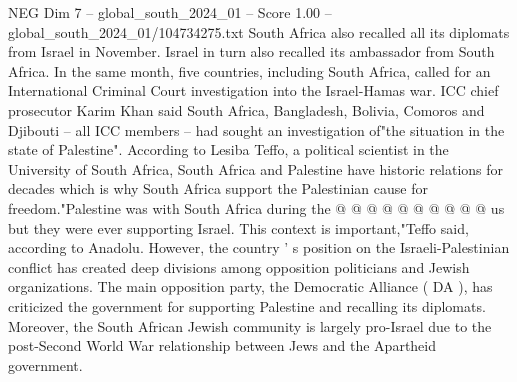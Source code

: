 \begin{textsample}{NEG Dim 7 – global\_south\_2024\_01 – Score 1.00 – global\_south\_2024\_01/104734275.txt}
South Africa also recalled all its diplomats from Israel in November.
Israel in turn also recalled its ambassador from South Africa.
In the same month, five countries, including South Africa, called for an International Criminal Court investigation into the Israel-Hamas war.
ICC chief prosecutor Karim Khan said South Africa, Bangladesh, Bolivia, Comoros and Djibouti -- all ICC members -- had sought an investigation of"the situation in the state of Palestine".
According to Lesiba Teffo, a political scientist in the University of South Africa, South Africa and Palestine have historic relations for decades which is why South Africa support the Palestinian cause for freedom."Palestine was with South Africa during the @ @ @ @ @ @ @ @ @ @ us but they were ever supporting Israel.
This context is important,"Teffo said, according to Anadolu.
However, the country ' s position on the Israeli-Palestinian conflict has created deep divisions among opposition politicians and Jewish organizations.
The main opposition party, the Democratic Alliance ( DA ), has criticized the government for supporting Palestine and recalling its diplomats.
Moreover, the South African Jewish community is largely pro-Israel due to the post-Second World War relationship between Jews and the Apartheid government.

\end{textsample}
